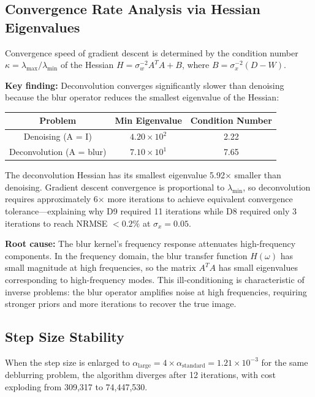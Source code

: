\documentclass[12pt]{article}
\begin{document}
\subsection*{Convergence Rate Analysis via Hessian Eigenvalues}

Convergence speed of gradient descent is determined by the condition number $\kappa = \lambda_{\max} / \lambda_{\min}$ of the Hessian $H = \sigma_w^{-2} A^T A + B$, where $B = \sigma_x^{-2}(D - W)$.

\textbf{Key finding:} Deconvolution converges significantly slower than denoising because the blur operator reduces the smallest eigenvalue of the Hessian:

\begin{center}
\begin{tabular}{|c|c|c|}
\hline
\textbf{Problem} & \textbf{Min Eigenvalue} & \textbf{Condition Number} \\
\hline
Denoising (A = I) & $4.20 \times 10^2$ & 2.22 \\
\hline
Deconvolution (A = blur) & $7.10 \times 10^1$ & 7.65 \\
\hline
\end{tabular}
\end{center}

The deconvolution Hessian has its smallest eigenvalue 5.92× smaller than denoising. Gradient descent convergence is proportional to $\lambda_{\min}$, so deconvolution requires approximately 6× more iterations to achieve equivalent convergence tolerance—explaining why D9 required 11 iterations while D8 required only 3 iterations to reach NRMSE $< 0.2\%$ at $\sigma_x = 0.05$.

\textbf{Root cause:} The blur kernel's frequency response attenuates high-frequency components. In the frequency domain, the blur transfer function $H(\omega)$ has small magnitude at high frequencies, so the matrix $A^T A$ has small eigenvalues corresponding to high-frequency modes. This ill-conditioning is characteristic of inverse problems: the blur operator amplifies noise at high frequencies, requiring stronger priors and more iterations to recover the true image.

\subsection*{Step Size Stability}

When the step size is enlarged to $\alpha_{\text{large}} = 4 \times \alpha_{\text{standard}} = 1.21 \times 10^{-3}$ for the same deblurring problem, the algorithm diverges after 12 iterations, with cost exploding from 309,317 to 74,447,530.
\end{document}
